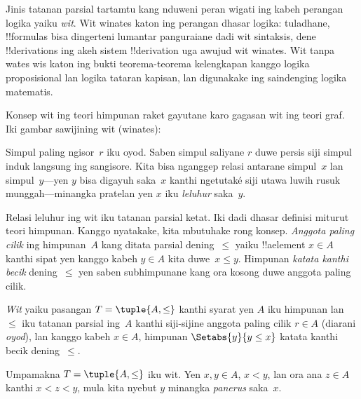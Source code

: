 \documentclass[../../../include/open-logic-section]{subfiles}
\begin{document}

Jinis tatanan parsial tartamtu kang nduweni peran wigati
ing kabeh perangan logika yaiku \emph{wit}.
Wit winates katon ing perangan dhasar logika:
tuladhane, !!{formula}s bisa dingerteni lumantar
panguraiane dadi wit sintaksis, dene !!{derivation}s
ing akeh sistem !!{derivation} uga awujud wit winates.
%
Wit tanpa wates wis katon ing bukti teorema-teorema
kelengkapan kanggo logika proposisional lan logika
tataran kapisan, lan digunakake ing saindenging logika matematis.

Konsep wit ing teori himpunan raket gayutane karo
gagasan wit ing teori graf.
Iki gambar sawijining wit (winates):

\begin{center}
\end{center}

Simpul paling ngisor~$r$ iku oyod.
Saben simpul saliyane $r$ duwe persis siji simpul induk
langsung ing sangisore. Kita bisa nganggep relasi
antarane simpul~$x$ lan simpul~$y$---yen
$y$ bisa digayuh saka~$x$ kanthi ngetutaké siji utawa luwih rusuk
munggah---minangka pratelan yen $x$ iku \emph{leluhur} saka~$y$.

Relasi leluhur ing wit iku tatanan parsial ketat.
Iki dadi dhasar definisi miturut teori himpunan.
Kanggo nyatakake, kita mbutuhake rong konsep.
\emph{Anggota paling cilik} ing himpunan~$A$
kang ditata parsial dening~$\le$ yaiku
!!a{element} $x \in A$ kanthi sipat yen
kanggo kabeh $y \in A$ kita duwe~$x \le y$.
Himpunan \emph{katata kanthi becik} dening~$\le$
yen saben subhimpunane kang ora kosong duwe
anggota paling cilik.

\begin{defn}[Wit]
\emph{Wit} yaiku pasangan $T = \tuple{A, \le}$
kanthi syarat yen $A$ iku himpunan lan $\le$
iku tatanan parsial ing~$A$ kanthi siji-sijine
anggota paling cilik $r \in A$
(diarani \emph{oyod}), lan kanggo kabeh $x \in A$,
himpunan $\Setabs{y}{y \le x}$
katata kanthi becik dening~$\le$.
\end{defn}

\begin{defn}[Panerus]
Umpamakna $T = \tuple{A, \le}$ iku wit.
Yen $x,y \in A$, $x < y$, lan ora ana
$z \in A$ kanthi $x < z < y$,
mula kita nyebut $y$ minangka \emph{panerus} saka~$x$.
\end{defn}
\end{document}
